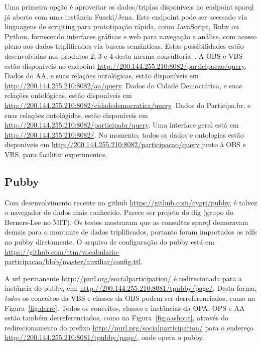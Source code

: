 \documentclass[12pt]{article}
\begin{document}
Uma primeira opção é aproveitar os dados/triplas disponíveis no endpoint sparql já aberto com uma instância Fuseki/Jena. Este endpoint pode ser acessado via linguagens de scripting para prototipação rápida, como JavaScript, Ruby ou Python, fornecendo interfaces gráficas e web para navegação e análise, com acesso pleno aos dados triplificados via buscas semânticas. Estas possibilidades estão desenvolvidas nos produtos 2, 3 e 4 desta mesma consultoria~\cite{repoProd2, repoProd3, repoProd4}. A OBS e VBS estão disponíveis no endpoint \url{http://200.144.255.210:8082/participacao/query}. Dados do AA, e suas relações ontológicas, estão disponíveis em \url{http://200.144.255.210:8082/aa/query}. Dados do Cidade Democrática, e suas relações ontológicas, estão disponíveis em \url{http://200.144.255.210:8082/cidadedemocratica/query}. Dados do Participa.br, e suas relações ontológidas, estão disponíveis em \url{http://200.144.255.210:8082/participabr/query}. Uma interface geral está em \url{http://200.144.255.210:8082/}. No momento, todos os dados e ontologias estão disponiveis em  \url{http://200.144.255.210:8082/participacao/query} junto à OBS e VBS, para facilitar experimentos.

\subsection{Pubby}
Com desenvolvimento recente no github \url{https://github.com/cygri/pubby}, é talvez o navegador de dados mais conhecido. Parece ser projeto do dig (grupo do Berners-Lee no MIT).
Os testes mostraram que as consultas sparql demoravam demais para o montante de dados triplificados, portanto foram importados os rdfs no pubby diretamente. O arquivo de configuração do pubby está em \url{https://github.com/ttm/vocabulario-participacao/blob/master/auxiliar/config.ttl}.

A url permanente \url{http://purl.org/socialparticipation/} é redirecionada para a instância do pubby, em: \url{http://200.144.255.210:8081/tpubby/page/}. Desta forma, \emph{todos} os conceitos da VBS e classes da OBS podem ser derreferenciados, como na Figura~\ref{fig:derre}. Todos os conceitos, classes e instâncias da OPA, OPS e AA estão também derreferenciados, como na Figura~\ref{fig:aashout}, através do redirecionamento do prefixo \url{http://purl.prg/socialparticipation/} para o endereço \url{http://200.144.255.210:8081/tpubby/page/}, onde opera o pubby.
\end{document}
